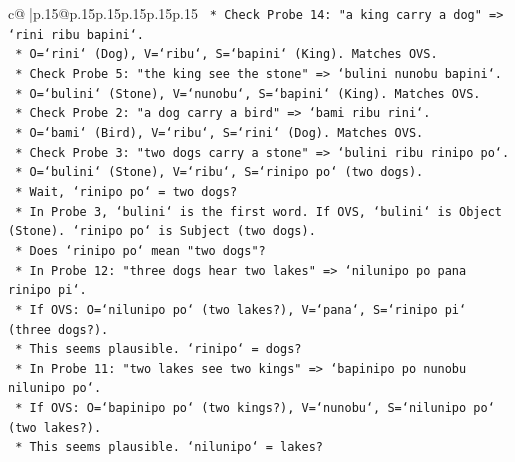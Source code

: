 \documentclass{article}
\begin{document}
{\begin{supertabular}{c@{$\;$}|p{.15\linewidth}@{}p{.15\linewidth}p{.15\linewidth}p{.15\linewidth}p{.15\linewidth}p{.15\linewidth}}
{{{\texttt{                                    *   Check Probe 14: "a king carry a dog" => `rini ribu bapini`.} \\
\texttt{                                        *   O=`rini` (Dog), V=`ribu`, S=`bapini` (King). Matches OVS.} \\
\texttt{                                    *   Check Probe 5: "the king see the stone" => `bulini nunobu bapini`.} \\
\texttt{                                        *   O=`bulini` (Stone), V=`nunobu`, S=`bapini` (King). Matches OVS.} \\
\texttt{                                    *   Check Probe 2: "a dog carry a bird" => `bami ribu rini`.} \\
\texttt{                                        *   O=`bami` (Bird), V=`ribu`, S=`rini` (Dog). Matches OVS.} \\
\texttt{                                    *   Check Probe 3: "two dogs carry a stone" => `bulini ribu rinipo po`.} \\
\texttt{                                        *   O=`bulini` (Stone), V=`ribu`, S=`rinipo po` (two dogs).} \\
\texttt{                                        *   Wait, `rinipo po` = two dogs?} \\
\texttt{                                        *   In Probe 3, `bulini` is the first word. If OVS, `bulini` is Object (Stone). `rinipo po` is Subject (two dogs).} \\
\texttt{                                        *   Does `rinipo po` mean "two dogs"?} \\
\texttt{                                        *   In Probe 12: "three dogs hear two lakes" => `nilunipo po pana rinipo pi`.} \\
\texttt{                                            *   If OVS: O=`nilunipo po` (two lakes?), V=`pana`, S=`rinipo pi` (three dogs?).} \\
\texttt{                                            *   This seems plausible. `rinipo` = dogs?} \\
\texttt{                                        *   In Probe 11: "two lakes see two kings" => `bapinipo po nunobu nilunipo po`.} \\
\texttt{                                            *   If OVS: O=`bapinipo po` (two kings?), V=`nunobu`, S=`nilunipo po` (two lakes?).} \\
\texttt{                                            *   This seems plausible. `nilunipo` = lakes?} \\
}}}
\end{supertabular}}
\end{document}
